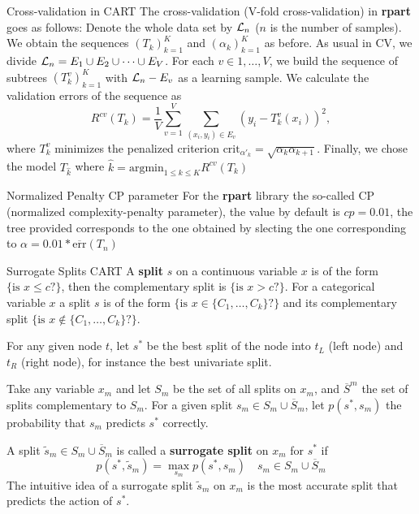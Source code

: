 \documentclass{beamer}
\begin{document}
\begin{frame}{Cross-validation in CART}
	The cross-validation (V-fold cross-validation) in \textbf{rpart} goes as follows:
	Denote the whole data set by ${\cal L}_n$ ($n$ is the number of samples). We obtain the sequences $(T_k)_{k=1}^K$ and $(\alpha_k)_{k =1}^K$ as before.  
	As usual in CV, we divide ${\cal L}_n= E_1 \cup E_2 \cup \cdots \cup E_V$. For each $v \in 1,\ldots, V$, we build the sequence of subtrees $(T_k^v)_{k=1}^K$ with ${\cal L}_n - E_v$ as a learning sample. We calculate the validation errors of the sequence as
	\begin{equation*}
		R^{cv}(T_k)= \frac{1}{V} \sum_{v=1}^V \sum_{(x_i,y_i)\in E_v} (y_i - T_k^v(x_i))^2,
	\end{equation*}
	where $T_k^v$ minimizes the penalized criterion $\text{crit}_{\alpha'_k}= \sqrt{\alpha_k \alpha_{k+1}}$. 
	Finally, we chose the model $T_{\hat{k}}$ where $\hat{k}= \text{argmin}_{1\le k \le K}R^{cv}(T_k)$
\end{frame}

\begin{frame}{Normalized Penalty CP parameter}
	For the \textbf{rpart} library the so-called CP (normalized complexity-penalty parameter), the value by default is $cp=0.01$, the tree provided corresponds to the one obtained by slecting the one corresponding to $\alpha=0.01* \overline{\text{err}}(T_n)$
\end{frame}

\begin{frame}{Surrogate Splits CART}
	A \textbf{split} $s$ on a continuous variable $x$ is of the form $\{ \textrm{is }x \le c ?\}$, then the complementary split is $\{ \textrm{is }x > c ?\}$. For a categorical variable $x$ a split $s$ is of the form $\{ \textrm{is }x \in \{C_1,\ldots, C_k\}?\}$ and its complementary split $\{ \textrm{is }x \notin \{C_1,\ldots, C_k\}?\}$.
	
	For any given node $t$, let $s^*$ be the best split of the node into $t_L$ (left node) and $t_R$ (right node), for instance the best univariate split.
	
	Take any variable $x_m$ and let $S_m$ be the set of all splits on $x_m$, and $\overline{S}^m$ the set of splits complementary to $S_m$.  For a given split $s_m\in S_m \cup \overline{S}_m$, let  $p(s^*,s_m)$ the probability that $s_m$ predicts $s^*$ correctly.
	
	A split $\tilde{s}_m   \in S_m \cup \overline{S}_m$ is called a \textbf{surrogate split} on $x_m$ for $s^*$ if 
	\begin{equation*}
		p(s^*,\tilde{s}_m)= \max_{s_m} p(s^*,s_m) \quad s_m \in S_m \cup \overline{S}_m
	\end{equation*}
	The intuitive idea of a surrogate split $\tilde{s}_m$ on $x_m$ is the most accurate split that predicts the action of $s^*$. 
\end{frame}
\end{document}
